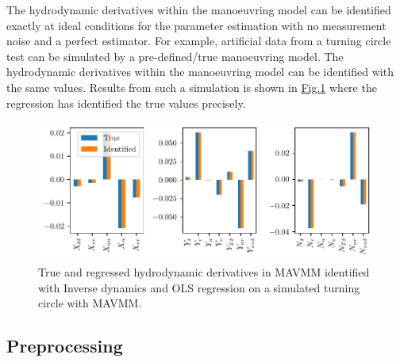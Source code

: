 The hydrodynamic derivatives within the manoeuvring model can be identified exactly at ideal conditions for the parameter estimation with no measurement noise and a perfect estimator. For example, artificial data from a turning circle test can be simulated by a pre-defined/true manoeuvring model. The hydrodynamic derivatives within the manoeuvring model can be identified with the same values. Results from such a simulation is shown in \hyperref[\detokenize{06.40_results_inverse_dynamics:fig-bar-parameters}]{Fig.\@ \ref{\detokenize{06.40_results_inverse_dynamics:fig-bar-parameters}}} where the regression has identified the true values precisely.

\begin{figure}[!htb]
\centering
\includegraphics{kappa/images/5.pdf}
\caption{True and regressed hydrodynamic derivatives in MAVMM identified with Inverse dynamics and OLS regression on a simulated turning circle with MAVMM.}\label{\detokenize{06.40_results_inverse_dynamics:fig-bar-parameters}}\end{figure}


\subsection{Preprocessing}
\label{\detokenize{06.31_results_noise:preprocessing}}\label{\detokenize{06.31_results_noise::doc}}

